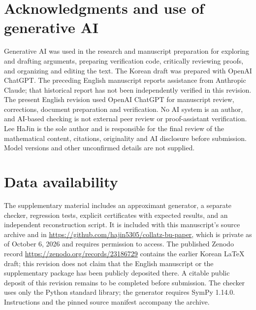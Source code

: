 \documentclass[11pt]{amsart}
\theoremstyle{remark}
\theoremstyle{definition}
\numberwithin{equation}{section}
\begin{document}
\section*{Acknowledgments and use of generative AI}

Generative AI was used in the research and manuscript preparation for exploring and drafting arguments, preparing verification code, critically reviewing proofs, and organizing and editing the text. The Korean draft was prepared with OpenAI ChatGPT. The preceding English manuscript reports assistance from Anthropic Claude; that historical report has not been independently verified in this revision. The present English revision used OpenAI ChatGPT for manuscript review, corrections, document preparation and verification. No AI system is an author, and AI-based checking is not external peer review or proof-assistant verification. Lee HaJin is the sole author and is responsible for the final review of the mathematical content, citations, originality and AI disclosure before submission. Model versions and other unconfirmed details are not supplied.

\section*{Data availability}

The supplementary material includes an approximant generator, a separate checker, regression tests, explicit certificates with expected results, and an independent reconstruction script. It is included with this manuscript's source archive and in \url{https://github.com/hajin5305/collatz-bu-paper}, which is private as of October 6, 2026 and requires permission to access. The published Zenodo record \url{https://zenodo.org/records/23186729} contains the earlier Korean LaTeX draft; this revision does not claim that the English manuscript or the supplementary package has been publicly deposited there. A citable public deposit of this revision remains to be completed before submission. The checker uses only the Python standard library; the generator requires SymPy 1.14.0. Instructions and the pinned source manifest accompany the archive.
\end{document}

